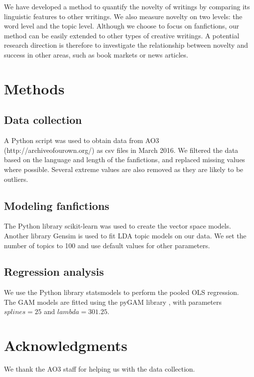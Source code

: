 \documentclass[letterpaper]{article} %
\begin{document}
We have developed a method to quantify the novelty of writings by comparing its linguistic features to other writings. We also measure novelty on two levels: the word level and the topic level. Although we choose to focus on fanfictions, our method can be easily extended to other types of creative writings. A potential research direction is therefore to investigate the relationship between novelty and success in other areas, such as book markets or news articles. 



\section*{Methods}

\subsection*{Data collection}
A Python script was used to obtain data from AO3 (http://archiveofourown.org/) as csv files in March 2016. We filtered the data based on the language and length of the fanfictions, and replaced missing values where possible. Several extreme values are also removed as they are likely to be outliers.

\subsection*{Modeling fanfictions}
The Python library scikit-learn was used to create the vector space models. Another library Gensim is used to fit LDA topic models on our data. We set the number of topics to 100 and use default values for other parameters. 

\subsection*{Regression analysis}
We use the Python library statsmodels \cite{seabold2010statsmodels} to perform the pooled OLS regression. The GAM models are fitted using the pyGAM library \cite{pygam}, with parameters $splines=25$ and $lambda=301.25$.


\section{ Acknowledgments}
We thank the AO3 staff for helping us with the data collection.





\end{document}
